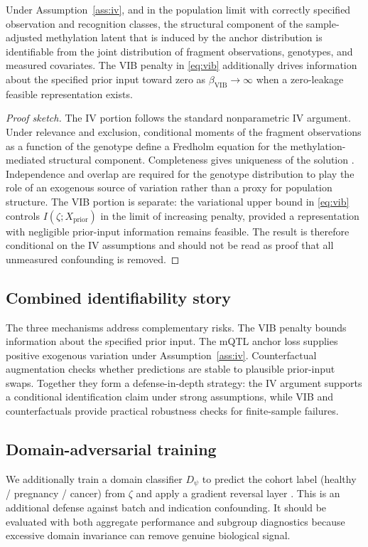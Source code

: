 \begin{proposition}
\label{prop:identify}
Under Assumption~\ref{ass:iv}, and in the population limit with correctly specified observation and recognition classes, the structural component of the sample-adjusted methylation latent that is induced by the anchor distribution is identifiable from the joint distribution of fragment observations, genotypes, and measured covariates. The VIB penalty in \eqref{eq:vib} additionally drives information about the specified prior input toward zero as $\beta_{\mathrm{VIB}}\to\infty$ when a zero-leakage feasible representation exists.
\end{proposition}
\begin{proof}[Proof sketch]
The IV portion follows the standard nonparametric IV argument. Under relevance and exclusion, conditional moments of the fragment observations as a function of the genotype define a Fredholm equation for the methylation-mediated structural component. Completeness gives uniqueness of the solution \citep{newey2003instrumental,darolles2011nonparametric}. Independence and overlap are required for the genotype distribution to play the role of an exogenous source of variation rather than a proxy for population structure. The VIB portion is separate: the variational upper bound in \eqref{eq:vib} controls $I(\zeta;X_{\mathrm{prior}})$ in the limit of increasing penalty, provided a representation with negligible prior-input information remains feasible. The result is therefore conditional on the IV assumptions and should not be read as proof that all unmeasured confounding is removed.
\end{proof}

\subsection{Combined identifiability story}
The three mechanisms address complementary risks. The VIB penalty bounds information about the specified prior input. The mQTL anchor loss supplies positive exogenous variation under Assumption~\ref{ass:iv}. Counterfactual augmentation checks whether predictions are stable to plausible prior-input swaps. Together they form a defense-in-depth strategy: the IV argument supports a conditional identification claim under strong assumptions, while VIB and counterfactuals provide practical robustness checks for finite-sample failures.

\subsection{Domain-adversarial training}
We additionally train a domain classifier $D_\psi$ to predict the cohort label (healthy / pregnancy / cancer) from $\zeta$ and apply a gradient reversal layer \citep{ganin2016dann}. This is an additional defense against batch and indication confounding. It should be evaluated with both aggregate performance and subgroup diagnostics because excessive domain invariance can remove genuine biological signal.

